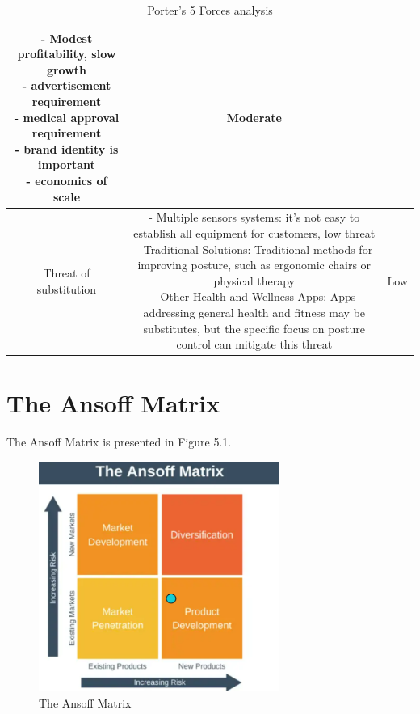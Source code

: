 \begin{table}[ht]
\begin{tabular}{|c|c|c|}
{            -	Modest profitability, slow growth\\
            -	advertisement requirement\\
            -	medical approval requirement\\
            -	brand identity is important\\
            -	economics of scale
            \vspace{5pt}
        } & Moderate \\
    \hline
        Threat of substitution &  \parbox{10cm}{\vspace{5pt}
            -	Multiple sensors systems: it's not easy to establish all equipment for customers, low threat\\
            -	Traditional Solutions: Traditional methods for improving posture, such as ergonomic chairs or physical therapy\\
            -	Other Health and Wellness Apps: Apps addressing general health and fitness may be substitutes, but the specific focus on posture control can mitigate this threat\vspace{5pt}
            \vspace{5pt}} & Low \\
    \hline
    \end{tabular}
    \caption{Porter's 5 Forces analysis}
\end{table}

\section{The Ansoff Matrix}

The Ansoff Matrix \cite{AnsoffMatrix} is presented in Figure 5.1.

\begin{figure}[H]
	\centering
	\includegraphics[width=0.7\textwidth]{figures/ansoff_matrix.png}
	\caption{The Ansoff Matrix}
	\label{fig:ansoff_matrix}
\end{figure}

